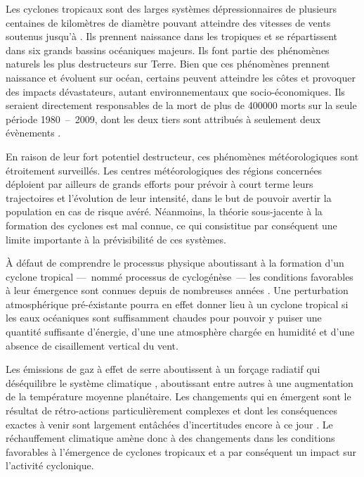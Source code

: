 \documentclass[../main.tex]{subfiles}
\begin{document}
Les cyclones tropicaux sont des larges systèmes dépressionnaires de plusieurs centaines de kilomètres de diamètre pouvant atteindre des vitesses de vents
soutenus jusqu'à . Ils prennent naissance dans les tropiques et se répartissent dans six grands bassins océaniques majeurs. Ils font partie des
phénomènes naturels les plus destructeurs sur Terre. Bien que ces phénomènes prennent naissance et évoluent sur océan, certains peuvent atteindre les côtes et
provoquer des impacts dévastateurs, autant environnementaux que socio-économiques. Ils seraient directement responsables de la mort de plus de \num{400000}
morts sur la seule période \num{1980}~--~\num{2009}, dont les deux tiers sont attribués à seulement deux évènements \parencite{doocy_human_2013}. 

En raison de leur fort potentiel destructeur, ces phénomènes météorologiques sont étroitement surveillés. Les centres météorologiques des régions concernées
déploient par ailleurs de grands efforts pour prévoir à court terme leurs trajectoires et l'évolution de leur intensité, dans le but de pouvoir avertir la
population en cas de risque avéré. Néanmoins, la théorie sous-jacente à la formation des cyclones est mal connue, ce qui consistitue par conséquent une limite
importante à la prévisibilité de ces systèmes.

À défaut de comprendre le processus physique aboutissant à la formation d'un cyclone tropical ---~nommé processus de cyclogénèse~--- les conditions favorables à
leur émergence sont connues depuis de nombreuses années \parencite{gray_tropical_1975}. Une perturbation atmosphérique pré-éxistante pourra en effet donner lieu
à un cyclone tropical si les eaux océaniques sont suffisamment chaudes pour pouvoir y puiser une quantité suffisante d'énergie, d'une une atmosphère chargée en
humidité et d'une absence de cisaillement vertical du vent.

Les émissions de gaz à effet de serre aboutissent à un forçage radiatif qui déséquilibre le système climatique \parencite{charney_carbon_1979}, aboutissant
entre autres à une augmentation de la température moyenne planétaire. Les changements qui en émergent sont le résultat de rétro-actions particulièrement
complexes et dont les conséquences exactes à venir sont largement entâchées d'incertitudes encore à ce jour \parencite{seneviratne_weather_2021}. Le
réchauffement climatique amène donc à des changements dans les conditions favorables à l'émergence de cyclones tropicaux et a par conséquent un impact sur
l'activité cyclonique.
\end{document}
